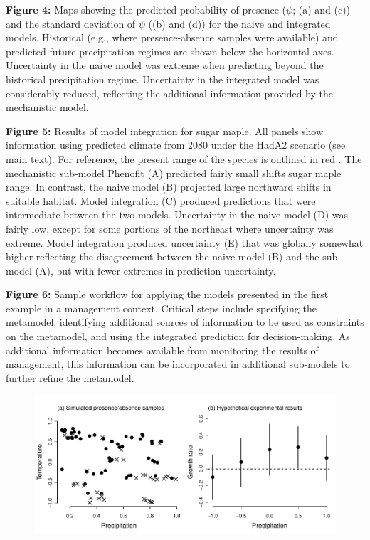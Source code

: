 \documentclass[11pt]{article}
\begin{document}
\begin{flushleft}
\textbf{Figure 4:} Maps showing the predicted probability of presence (\(\psi\); (a) and (c)) and the standard deviation of \(\psi\) ((b) and (d)) for the naive and integrated models.
	Historical (e.g., where presence-absence samples were available) and predicted future precipitation regimes are shown below the horizontal axes.
	Uncertainty in the naive model was extreme when predicting beyond the historical precipitation regime.
	Uncertainty in the integrated model was considerably reduced, reflecting the additional information provided by the mechanistic model.

\textbf{Figure 5:} Results of model integration for sugar maple.
	All panels show information using predicted climate from 2080 under the HadA2 scenario (see main text).
	For reference, the present range of the species is outlined in red \citep{Little1971}.
	The mechanistic sub-model Phenofit (A) predicted fairly small shifts sugar maple range.
	In contrast, the naive model (B) projected large northward shifts in suitable habitat.
	Model integration (C) produced predictions that were intermediate between the two models.
	Uncertainty in the naive model (D) was fairly low, except for some portions of the northeast where uncertainty was extreme.
	Model integration produced uncertainty (E) that was globally somewhat higher reflecting the disagreement between the naive model (B) and the sub-model (A), but with fewer extremes in prediction uncertainty.

\textbf{Figure 6:} Sample workflow for applying the models presented in the first example in a management context.
	Critical steps include specifying the metamodel, identifying additional sources of information to be used as constraints on the metamodel, and using the integrated prediction for decision-making.
	As additional information becomes available from monitoring the results of management, this information can be incorporated in additional sub-models to further refine the metamodel.

\end{flushleft}

\newpage
\begin{figure}[h!]

\caption{}
\label{fig:diagram}
\end{figure}


\newpage
\begin{figure}[h!]
	\includegraphics{ex1_sampling.pdf}
	\caption{}
	\label{fig:ex1_sampling}
\end{figure}
\end{document}
